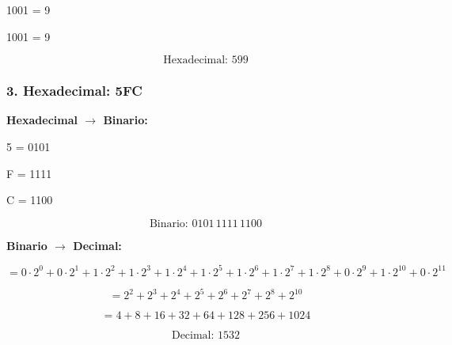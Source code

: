 1001 = 9

1001 = 9

\[
\text{Hexadecimal: } 599
\]

\subsubsection*{3. Hexadecimal: 5FC}

\textbf{Hexadecimal $\to$ Binario:}

5 = 0101

F = 1111

C = 1100

\[
\text{Binario: } 0101\,1111\,1100
\]

\textbf{Binario $\to$ Decimal:}

\[
 = 0\cdot 2^0 + 0\cdot 2^1 + 1\cdot 2^2 + 1\cdot 2^3
 + 1\cdot 2^4 + 1\cdot 2^5 + 1\cdot 2^6 + 1\cdot 2^7
 + 1\cdot 2^8 + 0\cdot 2^9 + 1\cdot 2^{10} + 0\cdot 2^{11}
\]

\[
 = 2^2 + 2^3 + 2^4 + 2^5 + 2^6 + 2^7 + 2^8 + 2^{10}
\]

\[
 = 4 + 8 + 16 + 32 + 64 + 128 + 256 + 1024 
\]

\[
\text{Decimal: }  1532
\]